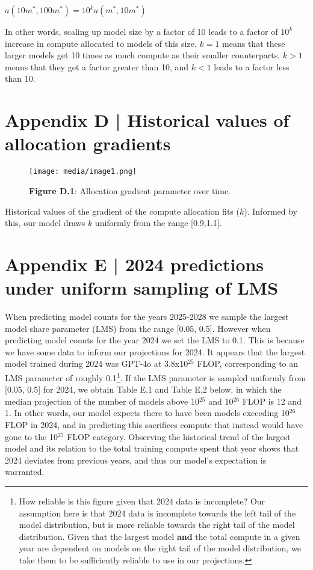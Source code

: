 \documentclass[11pt]{article}
\begin{document}
$a(10m^*, 100m^*) = 10^k a(m^*, 10m^*)$

In other words, scaling up model size by a factor of 10 leads to a factor of $10^k$ increase in compute allocated to models of this size. $k = 1$ means that these larger models get 10 times as much compute as their smaller counterparts, $k > 1$ means that they get a factor greater than 10, and $k < 1$ leads to a factor less than 10.

\section{Appendix D | Historical values of allocation gradients}
\label{appendix-d-historical-values-of-allocation-gradients}

\begin{figure}[h]
\centering
\texttt{[image: media/image1.png]}
\caption*{\textbf{Figure D.1}: Allocation gradient parameter over time.}
\end{figure}

Historical values of the gradient of the compute allocation fits ($k$). Informed by this, our model draws $k$ uniformly from the range [0.9,1.1].

\section{Appendix E | 2024 predictions under uniform sampling of LMS}
\label{appendix-e-2024-predictions-under-uniform-sampling-of-lms}

When predicting model counts for the years 2025-2028 we sample the largest model share parameter (LMS) from the range [0.05, 0.5]. However when predicting model counts for the year 2024 we set the LMS to 0.1. This is because we have some data to inform our projections for 2024. It appears that the largest model trained during 2024 was GPT-4o at 3.8x10$^{25}$ FLOP, corresponding to an LMS parameter of roughly 0.1\footnote{How reliable is this figure given that 2024 data is incomplete? Our assumption here is that 2024 data is incomplete towards the left tail of the model distribution, but is more reliable towards the right tail of the model distribution. Given that the largest model \textbf{and} the total compute in a given year are dependent on models on the right tail of the model distribution, we take them to be sufficiently reliable to use in our projections.}. If the LMS parameter is sampled uniformly from [0.05, 0.5] for 2024, we obtain Table E.1 and Table E.2 below, in which the median projection of the number of models above 10$^{25}$ and 10$^{26}$ FLOP is 12 and 1. In other words, our model expects there to have been models exceeding 10$^{26}$ FLOP in 2024, and in predicting this sacrifices compute that instead would have gone to the 10$^{25}$ FLOP category. Observing the historical trend of the largest model and its relation to the total training compute spent that year shows that 2024 deviates from previous years, and thus our model's expectation is warranted.
\end{document}
